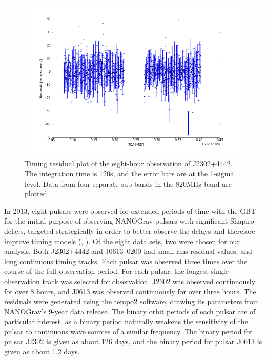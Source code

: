 \documentclass[12pt]{article}
\begin{document}
\begin{figure}[h!]
    \caption{Timing residual plot of the eight-hour observation of J2302+4442. The
integration time is 120s, and the error bars are at the 1-sigma level. Data from
four separate sub-bands in the 820MHz band are plotted.}
    \includegraphics[width=\textwidth]{./figures/J2302_residuals.png}
\end{figure}

   In 2013, eight pulsars were observed for extended periods of time with the GBT for the
initial purpose of observing NANOGrav pulsars with significant Shapiro delays,
targeted strategically in order to better observe the delays and therefore
improve timing models (\cite{Pennucci2015}, \cite{Fonseca2016}). 
Of the eight data sets, two were chosen for our
analysis. Both J2302+4442 and J0613--0200 had small rms residual values, and
long continuous timing tracks.  Each pulsar was observed three times over the
course of the full observation period.  For each pulsar, the longest single
observation track was selected for observation. J2302 was observed continuously
for over 8 hours, and J0613 was observed continuously for over three hours.
The residuals were generated using the tempo2 software, drawing its parameters
from NANOGrav's 9-year data release. The binary orbit periods of each pulsar
are of particular interest, as a binary period naturally weakens the
sensitivity of the pulsar to continuous wave sources of a similar frequency.
The binary period for pulsar J2302 is given as about 126 days, and the binary
period for pulsar J0613 is given as about 1.2 days.
\end{document}
